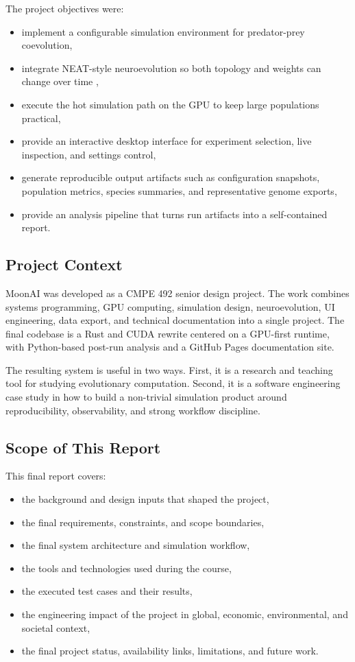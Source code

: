 The project objectives were:

\begin{itemize}[nosep]
  \item implement a configurable simulation environment for predator-prey coevolution,
  \item integrate NEAT-style neuroevolution so both topology and weights can change over time
    \cite{neat2002},
  \item execute the hot simulation path on the GPU to keep large populations practical,
  \item provide an interactive desktop interface for experiment selection, live inspection, and
    settings control,
  \item generate reproducible output artifacts such as configuration snapshots, population
    metrics, species summaries, and representative genome exports,
  \item provide an analysis pipeline that turns run artifacts into a self-contained report.
\end{itemize}

\subsection{Project Context}

MoonAI was developed as a CMPE 492 senior design project. The work combines systems
programming, GPU computing, simulation design, neuroevolution, UI engineering, data export,
and technical documentation into a single project. The final codebase is a Rust and CUDA
rewrite centered on a GPU-first runtime, with Python-based post-run analysis and a GitHub
Pages documentation site.

The resulting system is useful in two ways. First, it is a research and teaching tool for
studying evolutionary computation. Second, it is a software engineering case study in how to
build a non-trivial simulation product around reproducibility, observability, and strong
workflow discipline.

\subsection{Scope of This Report}

This final report covers:

\begin{itemize}[nosep]
  \item the background and design inputs that shaped the project,
  \item the final requirements, constraints, and scope boundaries,
  \item the final system architecture and simulation workflow,
  \item the tools and technologies used during the course,
  \item the executed test cases and their results,
  \item the engineering impact of the project in global, economic, environmental, and societal
    context,
  \item the final project status, availability links, limitations, and future work.
\end{itemize}
